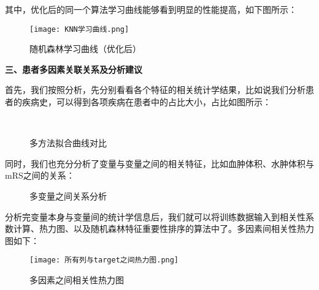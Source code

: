 \documentclass[bwprint]{gmcmthesis}
\begin{document}
				其中，优化后的同一个算法学习曲线能够看到明显的性能提高，如下图所示：
				
				\begin{figure}[H]
					\centering
					\caption{随机森林学习曲线（优化后）}
					\texttt{[image: KNN学习曲线.png]}
					\label{fig:14}
				\end{figure}
				
				\textbf{三、患者多因素关联关系及分析建议}
				
				首先，我们按照分析，先分别看看各个特征的相关统计学结果，比如说我们分析患者的疾病史，可以得到各项疾病在患者中的占比大小，占比如图所示：
				
				\begin{figure}[H]
					\centering
					\qquad
					 \qquad
					\\
					\qquad
					\qquad
					\qquad
					\caption{多方法拟合曲线对比}
				\end{figure}
				
				同时，我们也充分分析了变量与变量之间的相关特征，比如血肿体积、水肿体积与mRS之间的关系：
				
				\begin{figure}[H]
					\centering
					\qquad
					\caption{多变量之间关系分析}
				\end{figure}
				
				分析完变量本身与变量间的统计学信息后，我们就可以将训练数据输入到相关性系数计算、热力图、以及随机森林特征重要性排序的算法中了。多因素间相关性热力图如下：
				
				\begin{figure}[H]
					\centering
					\caption{多因素之间相关性热力图}
					\texttt{[image: 所有列与target之间热力图.png]}
				\end{figure}
				
\end{document}
